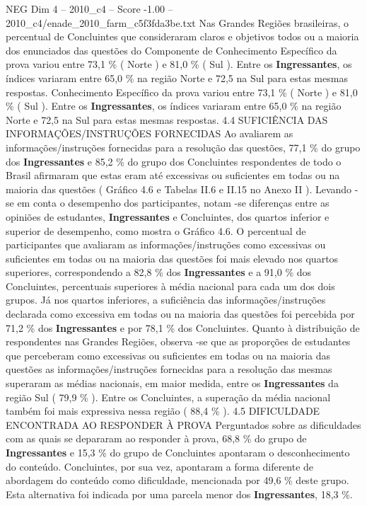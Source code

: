 \begin{textsample}{NEG Dim 4 – 2010\_c4 – Score -1.00 – 2010\_c4/enade\_2010\_farm\_c5f3fda3be.txt}
Nas Grandes Regiões brasileiras, o percentual de Concluintes que consideraram claros e objetivos todos ou a maioria dos enunciados das questões do Componente de Conhecimento Específico da prova variou entre 73,1 \% ( Norte ) e 81,0 \% ( Sul ).
Entre os \textbf{Ingressantes}, os índices variaram entre 65,0 \% na região Norte e 72,5 na Sul para estas mesmas respostas.
Conhecimento Específico da prova variou entre 73,1 \% ( Norte ) e 81,0 \% ( Sul ).
Entre os \textbf{Ingressantes}, os índices variaram entre 65,0 \% na região Norte e 72,5 na Sul para estas mesmas respostas. 4.4 SUFICIÊNCIA DAS INFORMAÇÕES/INSTRUÇÕES FORNECIDAS Ao avaliarem as informações/instruções fornecidas para a resolução das questões, 77,1 \% do grupo dos \textbf{Ingressantes} e 85,2 \% do grupo dos Concluintes respondentes de todo o Brasil afirmaram que estas eram até excessivas ou suficientes em todas ou na maioria das questões ( Gráfico 4.6 e Tabelas II.6 e II.15 no Anexo II ).
Levando -se em conta o desempenho dos participantes, notam -se diferenças entre as opiniões de estudantes, \textbf{Ingressantes} e Concluintes, dos quartos inferior e superior de desempenho, como mostra o Gráfico 4.6.
O percentual de participantes que avaliaram as informações/instruções como excessivas ou suficientes em todas ou na maioria das questões foi mais elevado nos quartos superiores, correspondendo a 82,8 \% dos \textbf{Ingressantes} e a 91,0 \% dos Concluintes, percentuais superiores à média nacional para cada um dos dois grupos.
Já nos quartos inferiores, a suficiência das informações/instruções declarada como excessiva em todas ou na maioria das questões foi percebida por 71,2 \% dos \textbf{Ingressantes} e por 78,1 \% dos Concluintes.
Quanto à distribuição de respondentes nas Grandes Regiões, observa -se que as proporções de estudantes que perceberam como excessivas ou suficientes em todas ou na maioria das questões as informações/instruções fornecidas para a resolução das mesmas superaram as médias nacionais, em maior medida, entre os \textbf{Ingressantes} da região Sul ( 79,9 \% ).
Entre os Concluintes, a superação da média nacional também foi mais expressiva nessa região ( 88,4 \% ). 4.5 DIFICULDADE ENCONTRADA AO RESPONDER À PROVA Perguntados sobre as dificuldades com as quais se depararam ao responder à prova, 68,8 \% do grupo de \textbf{Ingressantes} e 15,3 \% do grupo de Concluintes apontaram o desconhecimento do conteúdo.
Concluintes, por sua vez, apontaram a forma diferente de abordagem do conteúdo como dificuldade, mencionada por 49,6 \% deste grupo.
Esta alternativa foi indicada por uma parcela menor dos \textbf{Ingressantes}, 18,3 \%.

\end{textsample}

